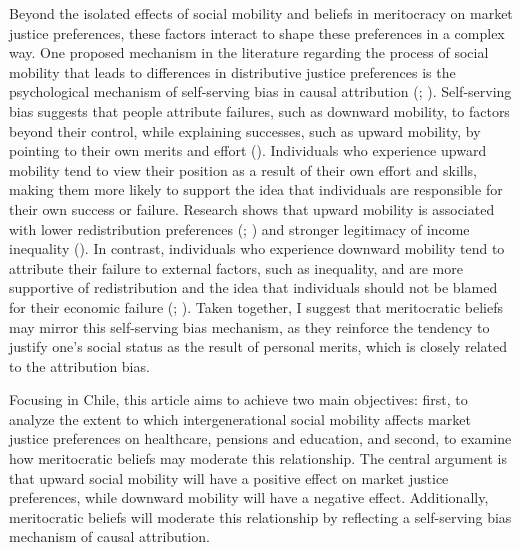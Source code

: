 \documentclass[
  12pt,
]{article}
\begin{document}
Beyond the isolated effects of social mobility and beliefs in
meritocracy on market justice preferences, these factors interact to
shape these preferences in a complex way. One proposed mechanism in the
literature regarding the process of social mobility that leads to
differences in distributive justice preferences is the psychological
mechanism of self-serving bias in causal attribution
(;
). Self-serving
bias suggests that people attribute failures, such as downward mobility,
to factors beyond their control, while explaining successes, such as
upward mobility, by pointing to their own merits and effort
().
Individuals who experience upward mobility tend to view their position
as a result of their own effort and skills, making them more likely to
support the idea that individuals are responsible for their own success
or failure. Research shows that upward mobility is associated with lower
redistribution preferences
(;
) and stronger
legitimacy of income inequality
(). In contrast,
individuals who experience downward mobility tend to attribute their
failure to external factors, such as inequality, and are more supportive
of redistribution and the idea that individuals should not be blamed for
their economic failure
(;
). Taken together,
I suggest that meritocratic beliefs may mirror this self-serving bias
mechanism, as they reinforce the tendency to justify one's social status
as the result of personal merits, which is closely related to the
attribution bias.

Focusing in Chile, this article aims to achieve two main objectives:
first, to analyze the extent to which intergenerational social mobility
affects market justice preferences on healthcare, pensions and
education, and second, to examine how meritocratic beliefs may moderate
this relationship. The central argument is that upward social mobility
will have a positive effect on market justice preferences, while
downward mobility will have a negative effect. Additionally,
meritocratic beliefs will moderate this relationship by reflecting a
self-serving bias mechanism of causal attribution.
\end{document}
